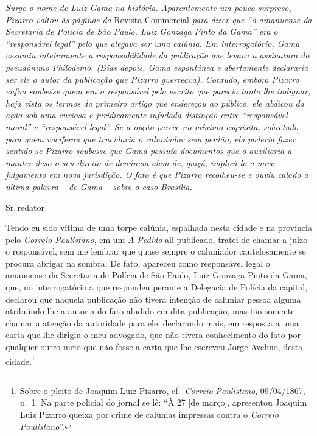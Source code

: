 \begin{didascalia}
\emph{Surge o nome de Luiz Gama na história. Aparentemente um pouco
surpreso, Pizarro voltou às páginas da} Revista Commercial \emph{para
dizer que ``o amanuense da Secretaria de Polícia de São Paulo, Luiz
Gonzaga Pinto da Gama'' era o ``responsável legal'' pelo que alegava ser
uma calúnia. Em interrogatório, Gama assumiu inteiramente a
responsabilidade da publicação que levava a assinatura do pseudônimo
Philodemo. (Dias depois, Gama espontânea e abertamente declararia ser
ele o autor da publicação que Pizarro guerreava). Contudo, embora
Pizarro enfim soubesse quem era o responsável pelo escrito que parecia
tanto lhe indignar, haja vista os termos do primeiro artigo que
endereçou ao público, ele abdicou da ação sob uma curiosa e
juridicamente infudada distinção entre ``responsável moral'' e
``responsável legal''. Se a opção parece no mínimo esquisita, sobretudo
para quem vociferou que trucidaria o caluniador sem perdão, ela poderia
fazer sentido se Pizarro soubesse que Gama possuía documentos que o
auxiliaria a manter ileso o seu direito de denúncia além de, quiçá,
implicá-lo a novo julgamento em nova jurisdição. O fato é que Pizarro
recolheu-se e ouviu calado a última palavra -- de Gama -- sobre o caso
Brasília.}
\end{didascalia}



Sr.\,redator

Tendo eu sido vítima de uma torpe calúnia, espalhada nesta cidade e na
província pelo \emph{Correio Paulistano}, em um \emph{A Pedido} ali
publicado, tratei de chamar a juízo o responsável, sem me lembrar que
quase sempre o caluniador cautelosamente se procura abrigar na sombra.
De fato, apareceu como responsável legal o amanuense da Secretaria de
Polícia de São Paulo, Luiz Gonzaga Pinto da Gama, que, no interrogatório
a que respondeu perante a Delegacia de Polícia da capital, declarou que
naquela publicação não tivera intenção de caluniar pessoa alguma
atribuindo-lhe a autoria do fato aludido em dita publicação, mas tão
somente chamar a atenção da autoridade para ele; declarando mais, em
resposta a uma carta que lhe dirigiu o meu advogado, que não tivera
conhecimento do fato por qualquer outro meio que não fosse a carta que
lhe escreveu Jorge Avelino, desta cidade.\footnote{ Sobre o pleito de
  Joaquim Luiz Pizarro, cf.~\emph{Correio Paulistano}, 09/04/1867, p.~1.
  Na parte policial do jornal se lê: ``À 27 {[}de março{]}, apresentou
  Joaquim Luiz Pizarro queixa por crime de calúnias impressas contra o
  \emph{Correio Paulistano}''.}

